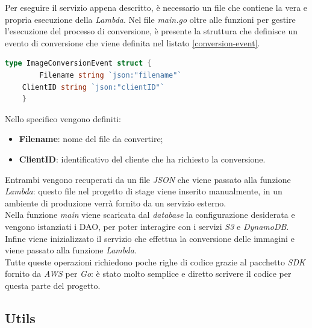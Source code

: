 Per eseguire il servizio appena descritto, è necessario un file che contiene la
vera e propria esecuzione della \emph{Lambda}. Nel file \emph{main.go} oltre
alle funzioni per gestire l'esecuzione del processo di conversione, è presente
la struttura che definisce un evento di conversione che viene definita nel
listato \ref{conversion-event}.
\begin{lstlisting}[label=conversion-event,caption={Struttura di un evento di conversione},captionpos=b, language=go]
    type ImageConversionEvent struct {
        Filename string `json:"filename"`
	ClientID string `json:"clientID"`
    }
\end{lstlisting}

Nello specifico vengono definiti:
\begin{itemize}
      \item \textbf{Filename}: nome del file da convertire;
      \item \textbf{ClientID}: identificativo del cliente che ha richiesto la
            conversione.
\end{itemize}
Entrambi vengono recuperati da un file \emph{JSON} che viene passato alla
funzione \emph{Lambda}: questo file nel progetto di stage viene inserito
manualmente, in un ambiente di produzione verrà fornito da un servizio
esterno.\\
Nella funzione \emph{main} viene scaricata dal \emph{database} la configurazione desiderata e
vengono istanziati i \glsfirstoccur\gls{DAO}, per poter
interagire con i servizi \emph{S3} e \emph{DynamoDB}. Infine viene
inizializzato il servizio che effettua la conversione delle immagini e viene
passato alla funzione \emph{Lambda}. \\
Tutte queste operazioni richiedono poche righe di codice grazie al pacchetto
\emph{SDK} fornito da \emph{AWS} per \emph{Go}: è stato molto semplice e diretto
scrivere il codice per questa parte del progetto.


\subsection{Utils}

